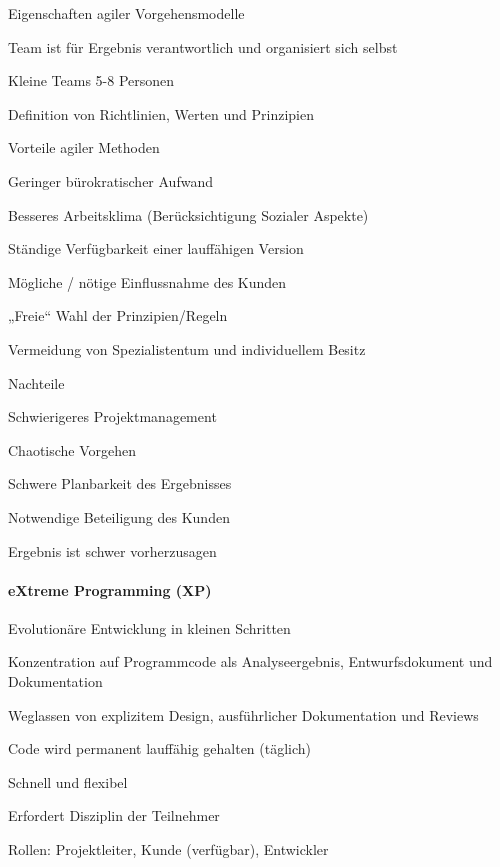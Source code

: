 \documentclass[a4paper]{article}
\begin{document}
\begin{multicols}{3}
  Eigenschaften agiler Vorgehensmodelle
  \begin{itemize*}
    \item Team ist für Ergebnis verantwortlich und organisiert sich selbst
    \item Kleine Teams 5-8 Personen
    \item Definition von Richtlinien, Werten und Prinzipien
    \item Vorteile agiler Methoden
    \begin{itemize*}
      \item Geringer bürokratischer Aufwand
      \item Besseres Arbeitsklima (Berücksichtigung Sozialer Aspekte)
      \item Ständige Verfügbarkeit einer lauffähigen Version
      \item Mögliche / nötige Einflussnahme des Kunden
      \item „Freie“ Wahl der Prinzipien/Regeln
      \item Vermeidung von Spezialistentum und individuellem Besitz
    \end{itemize*}
    \item Nachteile
    \begin{itemize*}
      \item Schwierigeres Projektmanagement
      \item Chaotische Vorgehen
      \item Schwere Planbarkeit des Ergebnisses
      \item Notwendige Beteiligung des Kunden
      \item Ergebnis ist schwer vorherzusagen
    \end{itemize*}
  \end{itemize*}

  \paragraph{eXtreme Programming (XP)}
  \begin{itemize*}
    \item Evolutionäre Entwicklung in kleinen Schritten
    \item Konzentration auf Programmcode als Analyseergebnis, Entwurfsdokument und Dokumentation
    \item Weglassen von explizitem Design, ausführlicher Dokumentation und Reviews
    \item Code wird permanent lauffähig gehalten (täglich)
    \item Schnell und flexibel
    \item Erfordert Disziplin der Teilnehmer
    \item Rollen: Projektleiter, Kunde (verfügbar), Entwickler
  \end{itemize*}


\end{multicols}
\end{document}
